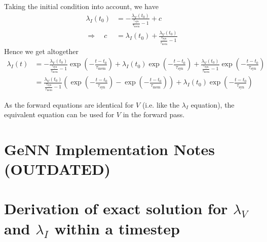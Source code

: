 \documentclass[a4paper]{article}
\begin{document}
Taking the initial condition into account, we have
\begin{align}
  \lambda_I(t_0) &= -\frac{\lambda_V(t_0)}{\frac{\tau_{\text{syn}}}{\tau_{\text{mem}}} -1} + c \\
  \Rightarrow \quad c &= \lambda_I(t_0) + \frac{\lambda_V(t_0)}{\frac{\tau_{\text{syn}}}{\tau_{\text{mem}}} -1}
\end{align}
Hence we get altogether
\begin{align}
  \lambda_I(t) &= -\frac{\lambda_V(t_0)}{\frac{\tau_{\text{syn}}}{\tau_{\text{mem}}} -1} \exp\left(-\frac{t-t_0}{\tau_{\text{mem}}} \right) + \lambda_I(t_0) \exp\left(-\frac{t-t_0}{\tau_{\text{syn}}}\right) + \frac{\lambda_V(t_0)}{\frac{\tau_{\text{syn}}}{\tau_{\text{mem}}} -1} \exp\left(-\frac{t-t_0}{\tau_{\text{syn}}}\right) \\
  &= \frac{\lambda_V(t_0)}{\frac{\tau_{\text{syn}}}{\tau_{\text{mem}}} -1} \left(\exp\left(-\frac{t-t_0}{\tau_{\text{syn}}}\right) - \exp\left(-\frac{t-t_0}{\tau_{\text{mem}}} \right) \right) + \lambda_I(t_0) \exp\left(-\frac{t-t_0}{\tau_{\text{syn}}}\right)
\end{align}

As the forward equations are identical for $V$ (i.e. like the $\lambda_I$ equation), the equivalent equation can be used for $V$ in the forward pass.

\section{GeNN Implementation Notes (OUTDATED)}
\section{Derivation of exact solution for $\lambda_V$ and $\lambda_I$
  within a timestep}
\end{document}
